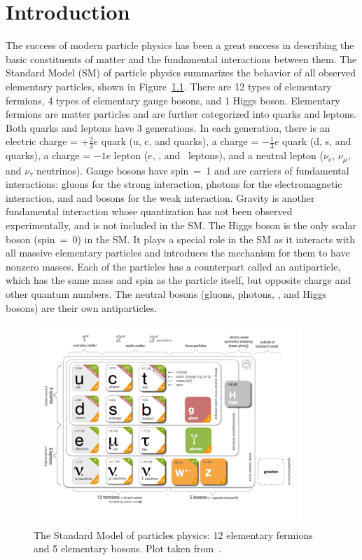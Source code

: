 \chapter{Introduction}

The success of modern particle physics has been a great success in describing the basic constituents of matter and the fundamental interactions between them.
The Standard Model (SM) of particle physics summarizes the behavior of all observed elementary particles, shown in Figure~\ref{fig:SM_table}.
There are 12 types of elementary fermions, 4 types of elementary gauge bosons, and 1 Higgs boson.
Elementary fermions are matter particles and are further categorized into quarks and leptons.
Both quarks and leptons have 3 generations.
In each generation, there is an electric charge = $+\frac{2}{3}e$ quark (u, c, and \Pqt quarks),
a charge = $-\frac{1}{3}e$ quark (d, s, and \Pqb quarks), 
a charge = $-1e$ lepton ($e$, \mu, and \tau ~leptons),
and a neutral lepton ($\nu_{e}$, $\nu_{\mu}$, and $\nu_{\tau}$ neutrinos).
Gauge bosons have spin~=~1 and are carriers of fundamental interactions: 
gluons for the strong interaction, photons for the electromagnetic interaction,
and \PW and \PZ bosons for the weak interaction.
Gravity is another fundamental interaction whose quantization has not been observed experimentally,
and is not included in the SM.
The Higgs boson is the only scalar boson (spin~=~0) in the SM.
It plays a special role in the SM as it interacts with all massive elementary particles 
and introduces the mechanism for them to have nonzero masses.
Each of the particles has a counterpart called an antiparticle, which has the same mass and spin as the particle itself, 
but opposite charge and other quantum numbers.
The neutral bosons (gluons, photons, \PZ, and Higgs bosons) are their own antiparticles.

\begin{figure}[!htb]
    \centering
    \captionsetup{justification=justified}
    \includegraphics[width=0.9\textwidth]{pics/Intro/standard_model_cern.png}
    \caption{The Standard Model of particles physics: 12 elementary fermions and 5 elementary bosons.
             Plot taken from~\cite{SM_table_CERN}. }
    \label{fig:SM_table}
\end{figure}

